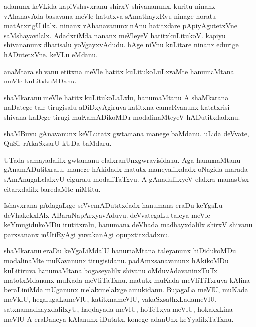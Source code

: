 \documentclass{article}
\begin{document}
\begin{mn}
adanunx  keVLida  kapiVshavxranu  shirxV  shivananunx,  kuritu  ninanx  vAhanavAda  basavana  meVle  
hatutxva  sAmathayxRvu  ninage  horatu  matAtxrigU  ilalx.  ninanx  vAhanavanunx  nAnu  hatitxdare  
pApiyAgutetxVne  saMshayavilalx.  AdadxriMda  nananx  meVleyeV  hatitxkuLitukoV.  kapiyu  shivananunx  
dharisalu  yoVgayxvAdudu.  hAge  niVnu  kuLitare  ninanx  edurige  hADutetxVne.  keVLu  eMdanu.
\end{mn}

\begin{mn}
anaMtara  shivanu  etitxna  meVle  hatitx  kuLitukoLuLxvaMte  hanumaMtana  meVle  kuLitukoMDanu.
\end{mn}

\begin{mn}
shaMkaranu  meVle  hatitx  kuLitukoLaLxlu,  hanumaMtanu  A  shaMkarana  naDatege  tale  tirugisalu  aDiDxyAgiruva  
katitxna  camaRvanunx  katatxrisi  shivana  kaDege  tirugi  muKamADikoMDu  modalinaMteyeV  hADutitxdadxnu.
\end{mn}

\begin{mn}
shaMBuvu  gAnavanunx  keVLutatx  gwtamana  manege  baMdanu.  uLida  deVvate,  QuSi,  rAkaSxsarU  kUDa  baMdaru.
\end{mn}

\begin{mn}
UTada  samayadalilx  gwtamanu  elalxranUnxgwravisidanu. Aga  hanumaMtanu  gAnamADutitxralu,  manege  
hAkidadx  matutx  maneyalilxdadx  oNagida  marada  sAmAnugaLelalxvU  ciguralu  modaliTaTxvu.  A  
gAnadalilxyeV  elalxra  manasUsx  citarxdalilx  baredaMte  niMtitu.
\end{mn}

\begin{mn}
Ishavxrana  pAdagaLige  seVvemADutitxdadx  hanumana  eraDu  keYgaLu  deVhakekxlAlx  ABaraNapArxyavAduvu.  
deVvategaLu  taleya  meVle  keYmugidukoMDu  irutitxralu,  hanumana  deVhada  madhayxdalilx  shirxV  shivanu  
parxsananx mUtiRyAgi  yuvakanAgi  opupxtitxdadxnu.
\end{mn}

\begin{mn}
shaMkaranu  eraDu  keYgaLiMdalU  hanumaMtana  taleyanunx  hiDidukoMDu  modalinaMte  muKavanunx  tirugisidanu.  
padAmxsanavanunx  hAkikoMDu  kuLitiruva  hanumaMtana  bogaseyalilx  shivanu  oMduvAdavaninxTuTx  
matotxMdanunx  muKada  meVliTaTxnu.  matutx  muKada  meVliTiTxruva  kAlina  beraLiniMda  mUganunx  
melalxmelalxge  amukidanu.  BujagaLa  meVlU,  muKada  meVklU,  hegalugaLameVlU,  katitxnameVlU,  
vakaSxsathxLadameVlU,  satxnamadhayxdalilxyU,  haqdayada  meVlU,  hoTeTxya  meVlU,  hokakxLina  
meVlU  A  eraDaneya  kAlanunx  iDutatx,  konege  adanUnx  keYyalilxTaTxnu.
\end{mn}
\end{document}

